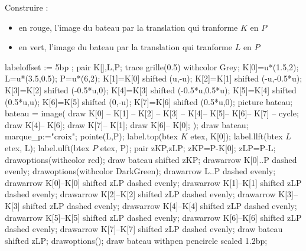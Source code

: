 \begin{corrige}
    Construire :
    \begin{itemize}
        \item en rouge, l'image du bateau par la translation qui tranforme $K$ en $P$
        \item en vert, l'image du bateau par la translation qui tranforme $L$ en $P$
    \end{itemize}
    \smallskip
    \hspace*{-5mm}
    \begin{Geometrie}[CoinHD={(8u,4u)}]
        labeloffset := 5bp ;
        pair K[],L,P;                    
        trace grille(0.5) withcolor Grey;
        K[0]=u*(1.5,2);
        L=u*(3.5,0.5);
        P=u*(6,2);
        K[1]=K[0] shifted (u,-u);
        K[2]=K[1] shifted (-u,-0.5*u);
        K[3]=K[2] shifted (-0.5*u,0);
        K[4]=K[3] shifted (-0.5*u,0.5*u);
        K[5]=K[4] shifted (0.5*u,u);
        K[6]=K[5] shifted (0,-u);
        K[7]=K[6] shifted (0.5*u,0);
        picture bateau;
        bateau = image( 
            draw K[0] -- K[1] -- K[2] -- K[3] -- K[4]-- K[5]-- K[6]-- K[7] -- cycle;
            draw K[4]-- K[6];
            draw K[7]-- K[1];
            draw K[6]-- K[0];
        );
        draw bateau;
        marque_p:="croix";
        pointe(L,P);
        label.top(btex $K$ etex, K[0]);
        label.llft(btex $L$ etex, L);
        label.ulft(btex $P$ etex, P);
        pair zKP,zLP;
        zKP=P-K[0];
        zLP=P-L;
        drawoptions(withcolor red);
        draw bateau shifted zKP;
        drawarrow K[0]..P dashed evenly;
        drawoptions(withcolor DarkGreen);
        drawarrow L..P dashed evenly;
        drawarrow K[0]--K[0] shifted zLP dashed evenly;
        drawarrow K[1]--K[1] shifted zLP dashed evenly;
        drawarrow K[2]--K[2] shifted zLP dashed evenly;
        drawarrow K[3]--K[3] shifted zLP dashed evenly;
        drawarrow K[4]--K[4] shifted zLP dashed evenly;
        drawarrow K[5]--K[5] shifted zLP dashed evenly;
        drawarrow K[6]--K[6] shifted zLP dashed evenly;
        drawarrow K[7]--K[7] shifted zLP dashed evenly;
        draw bateau shifted zLP;
        drawoptions();
        draw bateau withpen pencircle scaled 1.2bp;
    \end{Geometrie}
\end{corrige}

